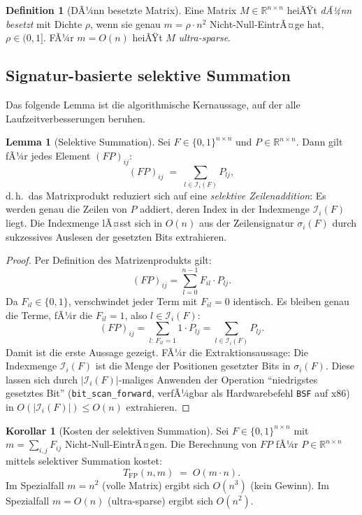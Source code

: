 ﻿\documentclass[a4paper,12pt]{article}
\theoremstyle{definition}
\newtheorem{definition}{Definition}
\newtheorem{lemma}{Lemma}
\newtheorem{korollar}{Korollar}
\begin{document}
\begin{definition}[DÃ¼nn besetzte Matrix]
    Eine Matrix $M \in \mathbb{R}^{n \times n}$ heiÃŸt \emph{dÃ¼nn besetzt} mit
    Dichte $\rho$, wenn sie genau $m = \rho \cdot n^2$ Nicht-Null-EintrÃ¤ge hat,
    $\rho \in (0,1]$. FÃ¼r $m = O(n)$ heiÃŸt $M$ \emph{ultra-sparse}.
\end{definition}

\subsection{Signatur-basierte selektive Summation}

Das folgende Lemma ist die algorithmische Kernaussage, auf der alle
Laufzeitverbesserungen beruhen.

\begin{lemma}[Selektive Summation]
\label{lem:selsum}
    Sei $F \in \{0,1\}^{n \times n}$ und $P \in \mathbb{R}^{n \times n}$.
    Dann gilt fÃ¼r jedes Element $(FP)_{ij}$:
    \[
        (FP)_{ij} \;=\; \sum_{l \in \mathcal{I}_i(F)} P_{lj},
    \]
    d.\,h.\ das Matrixprodukt reduziert sich auf eine \emph{selektive Zeilenaddition}:
    Es werden genau die Zeilen von $P$ addiert, deren Index in der Indexmenge
    $\mathcal{I}_i(F)$ liegt. Die Indexmenge lÃ¤sst sich in $O(n)$ aus der
    Zeilensignatur $\sigma_i(F)$ durch sukzessives Auslesen der gesetzten Bits extrahieren.
\end{lemma}

\begin{proof}
Per Definition des Matrizenprodukts gilt:
\[
    (FP)_{ij} = \sum_{l=0}^{n-1} F_{il} \cdot P_{lj}.
\]
Da $F_{il} \in \{0,1\}$, verschwindet jeder Term mit $F_{il} = 0$ identisch.
Es bleiben genau die Terme, fÃ¼r die $F_{il} = 1$, also $l \in \mathcal{I}_i(F)$:
\[
    (FP)_{ij} = \sum_{l:\, F_{il}=1} 1 \cdot P_{lj}
              = \sum_{l \in \mathcal{I}_i(F)} P_{lj}.
\]
Damit ist die erste Aussage gezeigt. FÃ¼r die Extraktionsaussage:
Die Indexmenge $\mathcal{I}_i(F)$ ist die Menge der Positionen gesetzter Bits
in $\sigma_i(F)$. Diese lassen sich durch $|\mathcal{I}_i(F)|$-maliges Anwenden
der Operation ``niedrigstes gesetztes Bit'' (\texttt{bit\_scan\_forward}, verfÃ¼gbar als
Hardwarebefehl \texttt{BSF} auf x86) in $O(|\mathcal{I}_i(F)|) \leq O(n)$ extrahieren.
\end{proof}

\begin{korollar}[Kosten der selektiven Summation]
\label{kor:selsum_cost}
    Sei $F \in \{0,1\}^{n \times n}$ mit $m = \sum_{i,j} F_{ij}$
    Nicht-Null-EintrÃ¤gen. Die Berechnung von $FP$ fÃ¼r $P \in \mathbb{R}^{n\times n}$
    mittels selektiver Summation kostet:
    \[
        T_{\mathrm{FP}}(n, m) \;=\; O(m \cdot n).
    \]
    Im Spezialfall $m = n^2$ (volle Matrix) ergibt sich $O(n^3)$ (kein Gewinn).
    Im Spezialfall $m = O(n)$ (ultra-sparse) ergibt sich $O(n^2)$.
\end{korollar}
\end{document}
